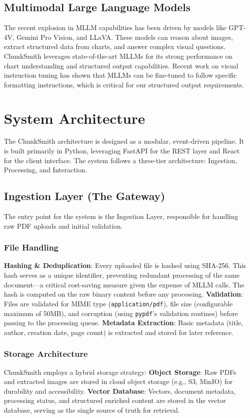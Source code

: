 \documentclass[conference]{IEEEtran}
\begin{document}
\subsection{Multimodal Large Language Models}
The recent explosion in MLLM capabilities has been driven by models like GPT-4V, Gemini Pro Vision, and LLaVA. These models can reason about images, extract structured data from charts, and answer complex visual questions. ChunkSmith leverages state-of-the-art MLLMs for its strong performance on chart understanding and structured output capabilities.
Recent work on visual instruction tuning \cite{liu2023visual} has shown that MLLMs can be fine-tuned to follow specific formatting instructions, which is critical for our structured output requirements.
\section{System Architecture}
The ChunkSmith architecture is designed as a modular, event-driven pipeline. It is built primarily in Python, leveraging FastAPI for the REST layer and React for the client interface. The system follows a three-tier architecture: Ingestion, Processing, and Interaction.
\subsection{Ingestion Layer (The Gateway)}
The entry point for the system is the Ingestion Layer, responsible for handling raw PDF uploads and initial validation.
\subsubsection{File Handling}
\textbf{Hashing \& Deduplication}: Every uploaded file is hashed using SHA-256. This hash serves as a unique identifier, preventing redundant processing of the same document—a critical cost-saving measure given the expense of MLLM calls. The hash is computed on the raw binary content before any processing.
\textbf{Validation}: Files are validated for MIME type (\texttt{application/pdf}), file size (configurable maximum of 50MB), and corruption (using \texttt{pypdf}'s validation routines) before passing to the processing queue.
\textbf{Metadata Extraction}: Basic metadata (title, author, creation date, page count) is extracted and stored for later reference.

\subsubsection{Storage Architecture}
ChunkSmith employs a hybrid storage strategy:
\textbf{Object Storage}: Raw PDFs and extracted images are stored in cloud object storage (e.g., S3, MinIO) for durability and accessibility.
\textbf{Vector Database}: Vectors, document metadata, processing status, and structured enriched content are stored in the vector database, serving as the single source of truth for retrieval.
\end{document}
